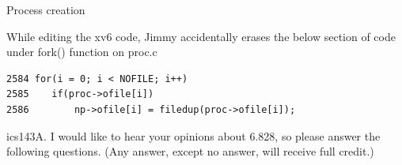 \documentclass[11pt]{exam}
\begin{document}
\begin{questions}
\newpage
\addpoints
\question Process creation


While editing the xv6 code, Jimmy accidentally erases the below section of
code under fork() function on proc.c
\begin{verbatim}
2584 for(i = 0; i < NOFILE; i++)
2585    if(proc->ofile[i])
2586        np->ofile[i] = filedup(proc->ofile[i]);
\end{verbatim}


\newpage
\addpoints

\question ics143A. I would like to hear your opinions about 6.828, so please answer the following questions. (Any answer, except
no answer, will receive full credit.)


\end{questions}
\end{document}
